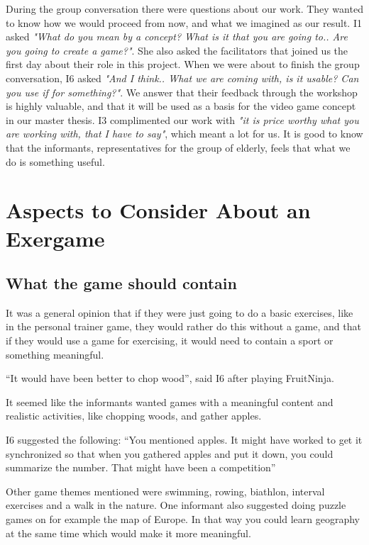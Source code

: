 During the group conversation there were questions about our work. They wanted to know how we would proceed from now, and what we imagined as our result. I1 asked \emph{"What do you mean by a concept? What is it that you are going to.. Are you going to create a game?"}. She also asked the facilitators that joined us the first day about their role in this project. When we were about to finish the group conversation, I6 asked \emph{"And I think.. What we are coming with, is it usable? Can you use if for something?"}. We answer that their feedback through the workshop is highly valuable, and that it will be used as a basis for the video game concept in our master thesis. I3 complimented our work with \emph{"it is price worthy what you are working with, that I have to say"}, which meant a lot for us. It is good to know that the informants, representatives for the group of elderly, feels that what we do is something useful.  

\section{Aspects to Consider About an Exergame}
\subsection{What the game should contain}

It was a general opinion that if they were just going to do a basic exercises, like in the personal trainer game, they would rather do this without a game, and that if they would use a game for exercising, it would need to contain a sport or something meaningful. 

“It would have been better to chop wood”, said I6 after playing FruitNinja. 

It seemed like the informants wanted games with a meaningful content and realistic activities, like chopping woods, and gather apples. 

I6 suggested the following: “You mentioned apples. It might have worked to get it synchronized so that when you gathered apples and put it down, you could summarize the number. That might have been a competition” 

Other game themes mentioned were swimming, rowing, biathlon, interval exercises and a walk in the nature. One informant also suggested doing puzzle games on for example the map of Europe. In that way you could learn geography at the same time which would make it more meaningful.

